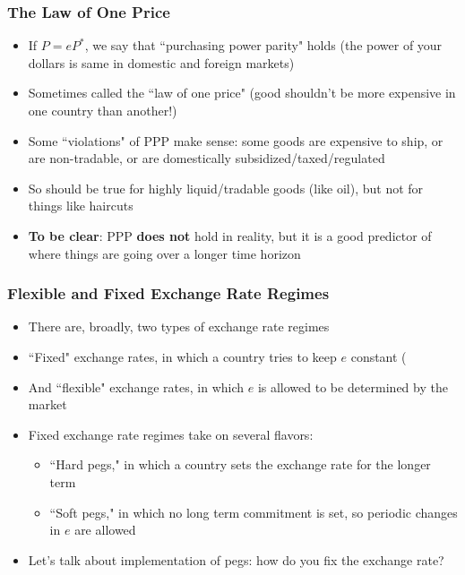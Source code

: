 \documentclass{beamer}
\begin{document}
\begin{frame}
\frametitle[alignment=center]{The Law of One Price}
\begin{itemize}
\item If $P=eP^*$, we say that  ``purchasing power parity" holds (the power of your dollars is same in domestic and foreign markets)
\bigskip
\item Sometimes called the ``law of one price" (good shouldn't be more expensive in one country than another!)
\bigskip
\item Some ``violations" of PPP make sense:  some goods are expensive to ship, or are non-tradable, or are domestically subsidized/taxed/regulated
\bigskip
\item So should be true for highly liquid/tradable goods (like oil), but not for things like haircuts
\bigskip
\item \textbf{To be clear}:  PPP \textbf{does not} hold in reality, but it is a good predictor of where things are going over a longer time horizon
\end{itemize}
\end{frame}

\begin{frame}
\frametitle[alignment=center]{Flexible and Fixed Exchange Rate Regimes}
\begin{itemize}
\item There are, broadly, two types of exchange rate regimes
\bigskip
\item ``Fixed" exchange rates, in which a country tries to keep $e$ constant (
\bigskip
\item And ``flexible" exchange rates, in which $e$ is allowed to be determined by the market 
\bigskip
\item Fixed exchange rate regimes take on several flavors:
\begin{itemize}
\item ``Hard pegs," in which a country sets the exchange rate for the longer term
\item ``Soft pegs," in which no long term commitment is set, so periodic changes in $e$ are allowed
\end{itemize}
\item Let's talk about implementation of pegs: how do you fix the exchange rate?
\end{itemize}
\end{frame}
\end{document}
